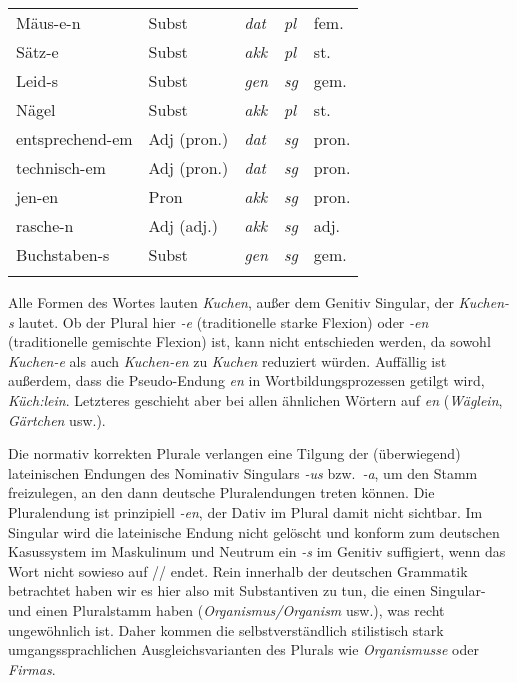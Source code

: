 \begin{center}
\begin{tabular}{lllll}
    Mäus-e-n & Subst & \textit{dat} & \textit{pl} & fem. \\
    Sätz-e & Subst & \textit{akk} & \textit{pl} & st. \\
    Leid-s & Subst & \textit{gen} & \textit{sg} & gem. \\
    Nägel & Subst & \textit{akk} & \textit{pl} & st. \\
    entsprechend-em & Adj (pron.) & \textit{dat} & \textit{sg} & pron. \\
    technisch-em & Adj (pron.) & \textit{dat} & \textit{sg} & pron. \\
    jen-en & Pron & \textit{akk} & \textit{sg} & pron. \\
    rasche-n & Adj (adj.) & \textit{akk} & \textit{sg} & adj. \\
    Buchstaben-s & Subst & \textit{gen} & \textit{sg} & gem. \\
    \lspbottomrule
  \end{tabular}
\end{center}


\begin{sloppypar}
Alle Formen des Wortes lauten \textit{Kuchen}, außer dem Genitiv Singular, der \textit{Kuchen-s} lautet.
Ob der Plural hier \textit{-e} (traditionelle starke Flexion) oder \textit{-en} (traditionelle gemischte Flexion) ist, kann nicht entschieden werden, da sowohl \textit{\Ast Kuchen-e} als auch \textit{\Ast Kuchen-en} zu \textit{Kuchen} reduziert würden.
Auffällig ist außerdem, dass die Pseudo-Endung \textit{en} in Wortbildungsprozessen getilgt wird, \zB \textit{Küch:}\textit{lein}.
Letzteres geschieht aber bei allen ähnlichen Wörtern auf \textit{en} (\textit{Wäglein}, \textit{Gärtchen} usw.).
\end{sloppypar}


Die normativ korrekten Plurale verlangen eine Tilgung der (überwiegend) lateinischen Endungen des Nominativ Singulars \textit{-us} bzw.\ \textit{-a}, um den Stamm freizulegen, an den dann deutsche Pluralendungen treten können.
Die Pluralendung ist prinzipiell \textit{-en}, der Dativ im Plural damit nicht sichtbar.
Im Singular wird die lateinische Endung nicht gelöscht und konform zum deutschen Kasussystem im Maskulinum und Neutrum ein \textit{-s} im Genitiv suffigiert, wenn das Wort nicht sowieso auf // endet.
Rein innerhalb der deutschen Grammatik betrachtet haben wir es hier also mit Substantiven zu tun, die einen Singular- und einen Pluralstamm haben (\textit{Organismus\slash Organism} usw.), was recht ungewöhnlich ist.
Daher kommen die selbstverständlich stilistisch stark umgangssprachlichen Ausgleichsvarianten des Plurals wie \textit{Organismusse} oder \textit{Firmas}.

